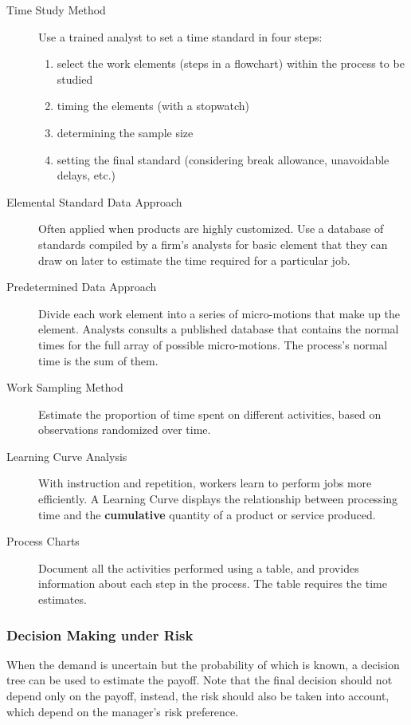 \documentclass{article}
\begin{document}
\begin{description}
	\item[Time Study Method]
	      Use a trained analyst to set a time standard in four steps:
	      \begin{enumerate}
		      \item select the work elements (steps in a flowchart) within the process to be studied
		      \item timing the elements (with a stopwatch)
		      \item determining the sample size
		      \item setting the final standard (considering break allowance, unavoidable delays, etc.)
	      \end{enumerate}
	\item[Elemental Standard Data Approach]
	      Often applied when products are highly customized. Use a database of standards compiled
	      by a firm's analysts for basic element that they can draw on later to estimate the time required
	      for a particular job.
	\item[Predetermined Data Approach]
	      Divide each work element into a series of micro-motions that make up the element.
	      Analysts consults a published database that contains the normal times for the full
	      array of possible micro-motions. The process's normal time is the sum of them.
	\item[Work Sampling Method]
	      Estimate the proportion of time spent on different activities,
	      based on observations randomized over time.
	\item[Learning Curve Analysis]
	      With instruction and repetition, workers learn to perform jobs more efficiently.
	      A Learning Curve displays the relationship between processing time and the
	      \textbf{cumulative} quantity of a product or service produced.
	\item[Process Charts]
	      Document all the activities performed using a table, and provides information about each step in the process.
	      The table requires the time estimates.
\end{description}


\subsubsection{Decision Making under Risk}

When the demand is uncertain but the probability of which is known,
a decision tree can be used to estimate the payoff.
Note that the final decision should not depend only on the payoff,
instead, the risk should also be taken into account,
which depend on the manager's risk preference.
\end{document}
